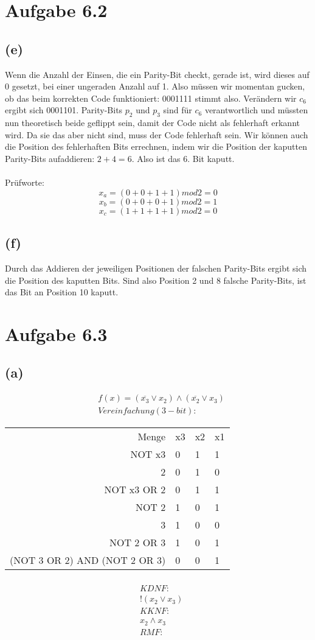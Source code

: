 \documentclass[12pt]{article}
\begin{document}
\section{Aufgabe 6.2}
\subsection{(e)}
Wenn die Anzahl der Einsen, die ein Parity-Bit checkt, gerade ist, wird dieses
auf 0 gesetzt, bei einer ungeraden Anzahl auf 1. Also müssen wir momentan
gucken, ob das beim korrekten Code funktioniert: 0001111 stimmt also.
Verändern wir \(c_6\) ergibt sich 0001101. Parity-Bits \(p_2\) und \(p_3\) sind für \(c_6\)
verantwortlich und müssten nun theoretisch beide geflippt sein, damit der Code
nicht als fehlerhaft erkannt wird. Da sie das aber nicht sind, muss der Code
fehlerhaft sein. Wir können auch die Position des fehlerhaften Bits errechnen,
indem wir die Position der kaputten Parity-Bits aufaddieren: \(2+4=6\). Also ist
das 6. Bit kaputt.\\\\
Prüfworte:
\[x_a = (0 + 0 + 1 + 1) mod 2 = 0\]
\[x_b = (0 + 0 + 0 + 1) mod 2 = 1\]
\[x_c = (1 + 1 + 1 + 1) mod 2 = 0\]

\subsection{(f)}
Durch das Addieren der jeweiligen Positionen der falschen Parity-Bits ergibt
sich die Position des kaputten Bits. Sind also Position 2 und 8 falsche
Parity-Bits, ist das Bit an Position 10 kaputt.

\section{Aufgabe 6.3}
\subsection{(a)}
\begin{align}
& f(x) = (\overline {x_3} \lor x_2) \land (\overline {x_2} \lor x_3)\\
&Vereinfachung (3-bit):
\end{align}
\begin{tabular} {r|l|l|l}
Menge & x3 & x2 & x1\\
NOT x3 & 0 & 1 & 1\\
2 & 0 & 1 & 0\\
NOT x3 OR 2 & 0 & 1 & 1\\
NOT 2 & 1 & 0 & 1\\
3  & 1 & 0 & 0\\
NOT 2 OR 3 & 1 & 0 & 1\\
(NOT 3 OR 2) AND (NOT 2 OR 3) & 0 & 0 & 1
\end{tabular}
\begin{align}
\\
& KDNF:\\
&! (x_2 \lor x_3)\\
& KKNF:\\
&x_2 \land x_3\\
& RMF:
\end{align}
\end{document}
